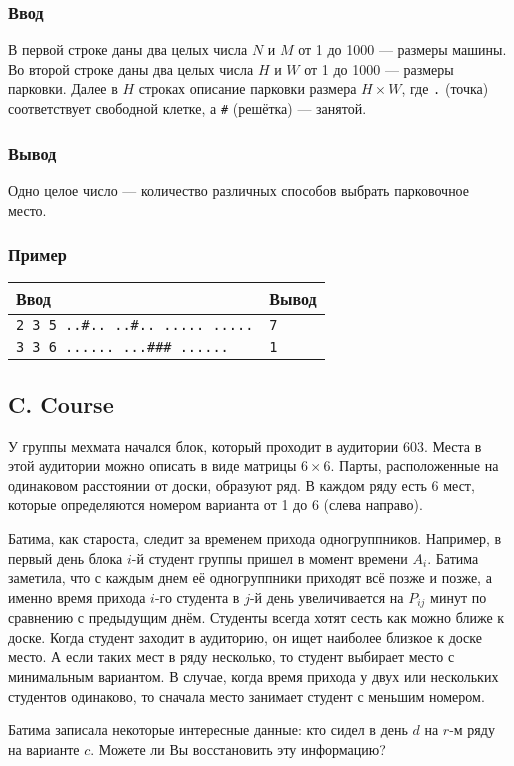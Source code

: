 \documentclass[10pt, a4paper]{article}
\newcommand{\informat}[1]
{
	\subsubsection*{Ввод} #1
}
\newcommand{\outformat}[1]
{
	\subsubsection*{Вывод} #1
}
\newcommand{\examplee}[4]
{
	\subsubsection*{Пример}
	\noindent
	\begin{center}
	\begin{tabularx}{\linewidth}{|X|X|}
	\hline
	Ввод 	& Вывод  	\\
	\hline
	{\tt #1} & {\tt #2}	\\
	\hline
	{\tt #3} & {\tt #4}	\\
	\hline
	\end{tabularx}
	\end{center}
}
\begin{document}
\informat{В первой строке даны два целых числа $N$ и $M$ от 1 до 1000 --- размеры машины. \newline 
Во второй строке даны два целых числа $H$ и $W$ от 1 до 1000 --- размеры парковки.\newline 
Далее в $H$ строках описание парковки размера $H \times W$, где {\tt .} (точка)  соответствует свободной клетке, а {\tt \#} (решётка) --- занятой.}

\outformat{Одно целое число --- количество различных способов выбрать парковочное место.}

\examplee
{2 3 \newline
4 5 \newline
..\#.. \newline
..\#.. \newline
..... \newline
.....}
{7}
{3 3 \newline
3 6 \newline
...... \newline
...\#\#\# \newline
......}
{1}



\subsection*{C. Course}


У группы мехмата начался блок, который проходит в аудитории $603$. Места в этой аудитории можно описать в виде матрицы $6 \times 6$. Парты, расположенные на одинаковом расстоянии от доски, образуют ряд. В каждом ряду есть 6 мест, которые определяются номером варианта от 1 до 6 (слева направо).

Батима, как староста, следит за временем прихода одногруппников. Например, в первый день блока $i$-й студент группы пришел в момент времени $A_i$. Батима заметила, что с каждым днем её одногруппники приходят всё позже и позже, а именно время прихода $i$-го студента в $j$-й день увеличивается на $P_{ij}$ минут по сравнению с предыдущим днём. Студенты всегда хотят сесть как можно ближе к доске. Когда студент заходит в аудиторию, он ищет наиболее близкое к доске место. А если таких мест в ряду несколько, то студент выбирает место с минимальным вариантом. В случае, когда время прихода у двух или нескольких студентов одинаково, то сначала место занимает студент с меньшим номером. 

Батима записала некоторые интересные данные: кто сидел в день $d$ на $r$-м ряду на варианте $c$. Можете ли Вы восстановить эту информацию?
\end{document}
